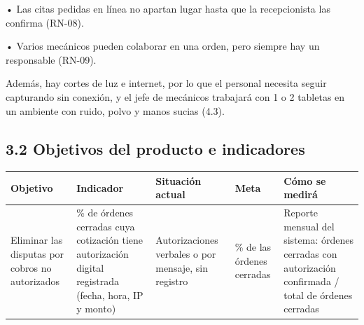 • Las citas pedidas en línea no apartan lugar hasta que la recepcionista
las confirma (RN-08).

• Varios mecánicos pueden colaborar en una orden, pero siempre hay un
responsable (RN-09).

Además, hay cortes de luz e internet, por lo que el personal necesita
seguir capturando sin conexión, y el jefe de mecánicos trabajará con 1 o
2 tabletas en un ambiente con ruido, polvo y manos sucias (4.3).

\subsection{3.2 Objetivos del producto e
indicadores}\label{objetivos-del-producto-e-indicadores}

{\def\LTcaptype{none} %
\begin{longtable}[]{@{}
  >{\raggedright\arraybackslash}p{}
  >{\raggedright\arraybackslash}p{}
  >{\raggedright\arraybackslash}p{}
  >{\raggedright\arraybackslash}p{}
  >{\raggedright\arraybackslash}p{}@{}}
\toprule\noalign{}
\begin{minipage}[b]{\linewidth}\raggedright
\textbf{Objetivo}
\end{minipage} & \begin{minipage}[b]{\linewidth}\raggedright
\textbf{Indicador}
\end{minipage} & \begin{minipage}[b]{\linewidth}\raggedright
\textbf{Situación actual}
\end{minipage} & \begin{minipage}[b]{\linewidth}\raggedright
\textbf{Meta}
\end{minipage} & \begin{minipage}[b]{\linewidth}\raggedright
\textbf{Cómo se medirá}
\end{minipage} \\
\midrule\noalign{}
\endhead
\bottomrule\noalign{}
\endlastfoot
Eliminar las disputas por cobros no autorizados & \% de órdenes cerradas
cuya cotización tiene autorización digital registrada (fecha, hora, IP y
monto) & Autorizaciones verbales o por mensaje, sin registro & 100 \% de
las órdenes cerradas & Reporte mensual del sistema: órdenes cerradas con
autorización confirmada / total de órdenes cerradas \\

\end{longtable}}
